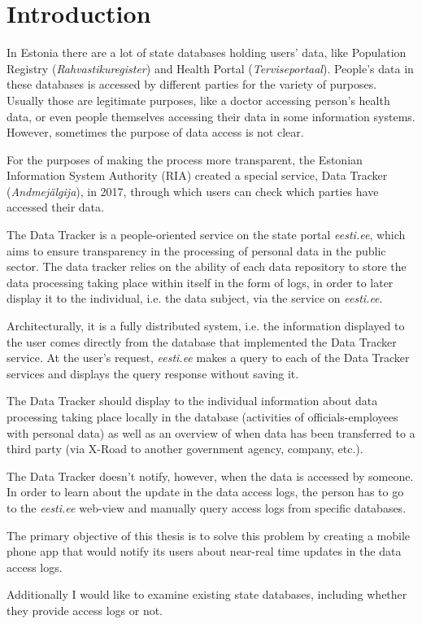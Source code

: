 \section{Introduction} \label{Introduction}

In Estonia there are a lot of state databases holding users' data, like Population Registry (\textit{Rahvastikuregister}) and Health Portal (\textit{Terviseportaal}). People's data in these databases is accessed by different parties for the variety of purposes. Usually those are legitimate purposes, like a doctor accessing person's health data, or even people themselves accessing their data in some information systems. However, sometimes the purpose of data access is not clear.

For the purposes of making the process more transparent, the Estonian Information System Authority (RIA) created a special service, Data Tracker (\textit{Andmejälgija}), in 2017, through which users can check which parties have accessed their data. \cite{err-population-registry-unauthorized-access}

The Data Tracker is a people-oriented service on the state portal \textit{eesti.ee}, which aims to ensure transparency in the processing of personal data in the public sector. The data tracker relies on the ability of each data repository to store the data processing taking place within itself in the form of logs, in order to later display it to the individual, i.e. the data subject, via the service on \textit{eesti.ee}.\cite{aj-github}

Architecturally, it is a fully distributed system, i.e. the information displayed to the user comes directly from the database that implemented the Data Tracker service. At the user's request, \textit{eesti.ee} makes a query to each of the Data Tracker services and displays the query response without saving it.\cite{aj-github}

The Data Tracker should display to the individual information about data processing taking place locally in the database (activities of officials-employees with personal data) as well as an overview of when data has been transferred to a third party (via X-Road to another government agency, company, etc.).\cite{aj-github}

The Data Tracker doesn't notify, however, when the data is accessed by someone. In order to learn about the update in the data access logs, the person has to go to the \textit{eesti.ee} web-view and manually query access logs from specific databases. 

The primary objective of this thesis is to solve this problem by creating a mobile phone app that would notify its users about near-real time updates in the data access logs. 

Additionally I would like to examine existing state databases, including whether they provide access logs or not.